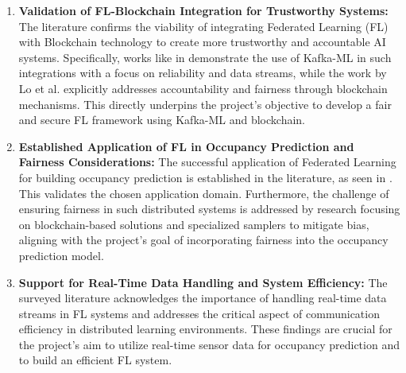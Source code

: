\begin{enumerate}
    \item \textbf{Validation of FL-Blockchain Integration for Trustworthy Systems:} The literature confirms the viability of integrating Federated Learning (FL) with Blockchain technology to create more trustworthy and accountable AI systems. Specifically, works like in \cite{chaves2024federated}  demonstrate the use of Kafka-ML in such integrations with a focus on reliability and data streams, while the work by Lo et al. \cite{lo2022toward} explicitly addresses accountability and fairness through blockchain mechanisms. This directly underpins the project's objective to develop a fair and secure FL framework using Kafka-ML and blockchain.

    \item \textbf{Established Application of FL in Occupancy Prediction and Fairness Considerations:} The successful application of Federated Learning for building occupancy prediction is established in the literature, as seen in \cite{khan2022occupancy}. This validates the chosen application domain. Furthermore, the challenge of ensuring fairness in such distributed systems is addressed by research focusing on blockchain-based solutions and specialized samplers to mitigate bias, aligning with the project's goal of incorporating fairness into the occupancy prediction model.

    \item \textbf{Support for Real-Time Data Handling and System Efficiency:} The surveyed literature acknowledges the importance of handling real-time data streams in FL systems and addresses the critical aspect of communication efficiency in distributed learning environments. These findings are crucial for the project's aim to utilize real-time sensor data for occupancy prediction and to build an efficient FL system.
\end{enumerate}

